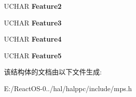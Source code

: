 \begin{DoxyCompactItemize}
U\+C\+H\+AR {\bfseries Feature2}
\item 
\mbox{\label{struct___m_p___f_l_o_a_t_i_n_g___p_o_i_n_t_e_r_a6abade87ec587f823e425577031f0698}} 
U\+C\+H\+AR {\bfseries Feature3}
\item 
\mbox{\label{struct___m_p___f_l_o_a_t_i_n_g___p_o_i_n_t_e_r_a7501794f9715ad88ee5562f3d9420bf6}} 
U\+C\+H\+AR {\bfseries Feature4}
\item 
\mbox{\label{struct___m_p___f_l_o_a_t_i_n_g___p_o_i_n_t_e_r_a0b2d275fc017d535d4a8d8ec361d58f3}} 
U\+C\+H\+AR {\bfseries Feature5}
\end{DoxyCompactItemize}


该结构体的文档由以下文件生成\+:\begin{DoxyCompactItemize}
\item 
E\+:/\+React\+O\+S-\/0../hal/halppc/include/mps.\+h\end{DoxyCompactItemize}
